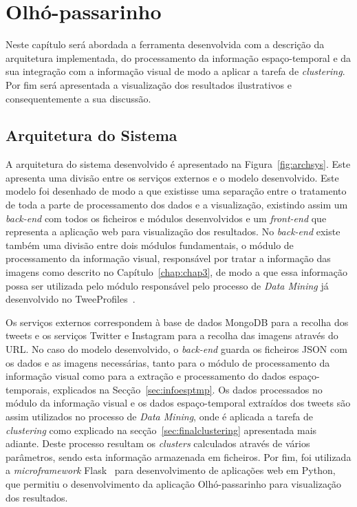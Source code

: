 \chapter{Olhó-passarinho}\label{chap:chap4}

Neste capítulo será abordada a ferramenta desenvolvida com a descrição da arquitetura implementada, do processamento da informação espaço-temporal e da sua integração com a informação visual de modo a aplicar a tarefa de \textit{clustering}. Por fim será apresentada a visualização dos resultados ilustrativos e consequentemente a sua discussão. 

\section{Arquitetura do Sistema}

A arquitetura do sistema desenvolvido é apresentado na Figura~\ref{fig:archsys}. Este apresenta uma divisão entre os serviços externos e o modelo desenvolvido. Este modelo foi desenhado de modo a que existisse uma separação entre o tratamento de toda a parte de processamento dos dados e a visualização, existindo assim um \textit{back-end} com todos os ficheiros e módulos desenvolvidos e um \textit{front-end} que representa a aplicação web para visualização dos resultados. No \textit{back-end} existe também uma divisão entre dois módulos fundamentais, o módulo de processamento da informação visual, responsável por tratar a informação das imagens como descrito no Capítulo~\ref{chap:chap3}, de modo a que essa informação possa ser utilizada pelo módulo responsável pelo processo de \textit{Data Mining} já desenvolvido no TweeProfiles~\cite{Cunha2013}. 

Os serviços externos correspondem à base de dados MongoDB para a recolha dos tweets e os serviços Twitter e Instagram para a recolha das imagens através do URL. No caso do modelo desenvolvido, o \textit{back-end} guarda os ficheiros JSON com os dados e as imagens necessárias, tanto para o módulo de processamento da informação visual como para a extração e processamento do dados espaço-temporais, explicados na Secção~\ref{sec:infoesptmp}. Os dados processados no módulo da informação visual e os dados espaço-temporal extraídos dos tweets são assim utilizados no processo de \textit{Data Mining}, onde é aplicada a tarefa de \textit{clustering} como explicado na secção~\ref{sec:finalclustering} apresentada mais adiante. Deste processo resultam os \textit{clusters} calculados através de vários parâmetros, sendo esta informação armazenada em ficheiros. Por fim, foi utilizada a \textit{microframework} Flask~\cite{flask} para desenvolvimento de aplicações web em Python, que permitiu o desenvolvimento da aplicação Olhó-passarinho para visualização dos resultados. 

